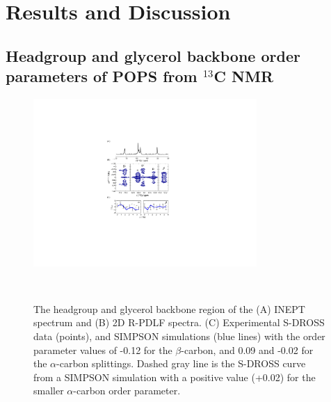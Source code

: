 \documentclass[aps,prl,superscriptaddress,twocolumn]{revtex4}
\begin{document}
\section{Results and Discussion}

\subsection{Headgroup and glycerol backbone order parameters of POPS from $^{13}$C NMR}

\begin{figure}[!tb]
  \centering
  \includegraphics[width=8.5cm]{../Figs/fig1_POPS.pdf}
  \caption{\label{PShgSIGNSsimpson}
    The headgroup and glycerol backbone region of the (A) INEPT spectrum and
    (B) 2D R-PDLF spectra.
    (C) Experimental S-DROSS data (points), and SIMPSON simulations (blue lines) with
    the order parameter values of -0.12 for the $\beta$-carbon, and 0.09 and -0.02
    for the $\alpha$-carbon splittings.
    Dashed gray line is the S-DROSS curve from a SIMPSON simulation with a positive value (+0.02) 
    for the smaller $\alpha$-carbon order parameter.
  }
  \\
\end{figure}
\end{document}
